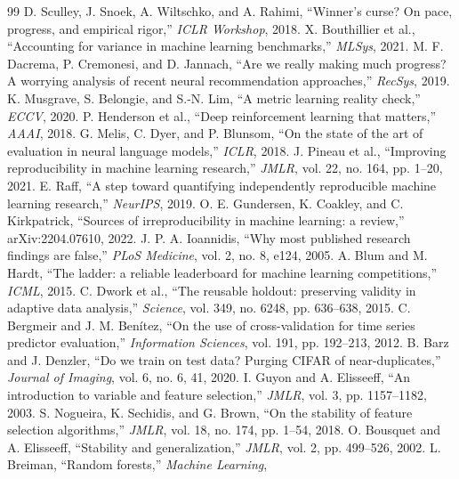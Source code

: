 \documentclass[10pt,twocolumn]{article}
\begin{document}
{\begin{thebibliography}{99}
 D. Sculley, J. Snoek, A. Wiltschko, and A. Rahimi,
``Winner's curse? On pace, progress, and empirical rigor,'' \emph{ICLR Workshop},
2018.
 X. Bouthillier et al., ``Accounting for variance in
machine learning benchmarks,'' \emph{MLSys}, 2021.
 M. F. Dacrema, P. Cremonesi, and D. Jannach, ``Are we
really making much progress? A worrying analysis of recent neural recommendation
approaches,'' \emph{RecSys}, 2019.
 K. Musgrave, S. Belongie, and S.-N. Lim, ``A metric
learning reality check,'' \emph{ECCV}, 2020.
 P. Henderson et al., ``Deep reinforcement learning that
matters,'' \emph{AAAI}, 2018.
 G. Melis, C. Dyer, and P. Blunsom, ``On the state of the art
of evaluation in neural language models,'' \emph{ICLR}, 2018.
 J. Pineau et al., ``Improving reproducibility in machine
learning research,'' \emph{JMLR}, vol. 22, no. 164, pp. 1--20, 2021.
 E. Raff, ``A step toward quantifying independently
reproducible machine learning research,'' \emph{NeurIPS}, 2019.
 O. E. Gundersen, K. Coakley, and C. Kirkpatrick,
``Sources of irreproducibility in machine learning: a review,''
arXiv:2204.07610, 2022.
 J. P. A. Ioannidis, ``Why most published research
findings are false,'' \emph{PLoS Medicine}, vol. 2, no. 8, e124, 2005.
 A. Blum and M. Hardt, ``The ladder: a reliable leaderboard for
machine learning competitions,'' \emph{ICML}, 2015.
 C. Dwork et al., ``The reusable holdout: preserving validity
in adaptive data analysis,'' \emph{Science}, vol. 349, no. 6248, pp. 636--638,
2015.
 C. Bergmeir and J. M. Ben\'itez, ``On the use of
cross-validation for time series predictor evaluation,'' \emph{Information
Sciences}, vol. 191, pp. 192--213, 2012.
 B. Barz and J. Denzler, ``Do we train on test data? Purging
CIFAR of near-duplicates,'' \emph{Journal of Imaging}, vol. 6, no. 6, 41, 2020.
 I. Guyon and A. Elisseeff, ``An introduction to variable and
feature selection,'' \emph{JMLR}, vol. 3, pp. 1157--1182, 2003.
 S. Nogueira, K. Sechidis, and G. Brown, ``On the stability
of feature selection algorithms,'' \emph{JMLR}, vol. 18, no. 174, pp. 1--54, 2018.
 O. Bousquet and A. Elisseeff, ``Stability and
generalization,'' \emph{JMLR}, vol. 2, pp. 499--526, 2002.
 L. Breiman, ``Random forests,'' \emph{Machine Learning},

\end{thebibliography}}
\end{document}
